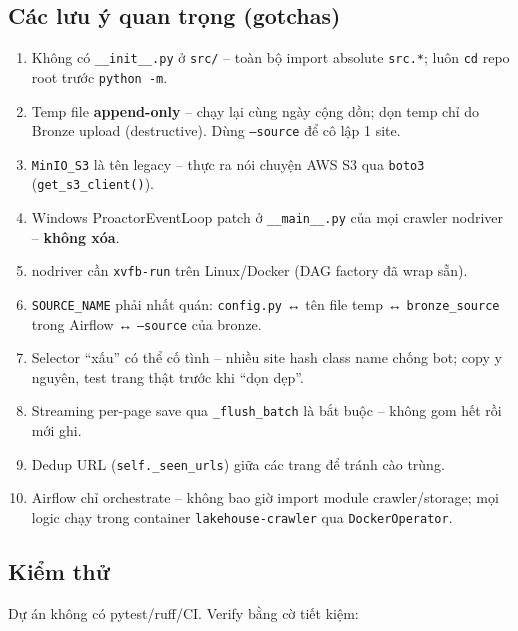 \subsection{Các lưu ý quan trọng (gotchas)}
\label{subsec:crawl-gotchas}

\begin{enumerate}
    \item Không có \texttt{\_\_init\_\_.py} ở \texttt{src/} -- toàn bộ import
          absolute \texttt{src.*}; luôn \texttt{cd} repo root trước
          \texttt{python -m}.
    \item Temp file \textbf{append-only} -- chạy lại cùng ngày cộng dồn; dọn temp
          chỉ do Bronze upload (destructive). Dùng \texttt{--source} để cô lập
          1 site.
    \item \texttt{MinIO\_S3} là tên legacy -- thực ra nói chuyện AWS S3 qua
          \texttt{boto3} (\texttt{get\_s3\_client()}).
    \item Windows ProactorEventLoop patch ở \texttt{\_\_main\_\_.py} của mọi
          crawler nodriver -- \textbf{không xóa}.
    \item nodriver cần \texttt{xvfb-run} trên Linux/Docker (DAG factory đã wrap
          sẵn).
    \item \texttt{SOURCE\_NAME} phải nhất quán: \texttt{config.py} ↔ tên file
          temp ↔ \texttt{bronze\_source} trong Airflow ↔ \texttt{--source} của
          bronze.
    \item Selector ``xấu'' có thể cố tình -- nhiều site hash class name chống bot;
          copy y nguyên, test trang thật trước khi ``dọn dẹp''.
    \item Streaming per-page save qua \texttt{\_flush\_batch} là bắt buộc -- không
          gom hết rồi mới ghi.
    \item Dedup URL (\texttt{self.\_seen\_urls}) giữa các trang để tránh cào trùng.
    \item Airflow chỉ orchestrate -- không bao giờ import module crawler/storage;
          mọi logic chạy trong container \texttt{lakehouse-crawler} qua
          \texttt{DockerOperator}.
\end{enumerate}


\subsection{Kiểm thử}
\label{subsec:crawl-verify}

Dự án không có pytest/ruff/CI. Verify bằng cờ tiết kiệm:

